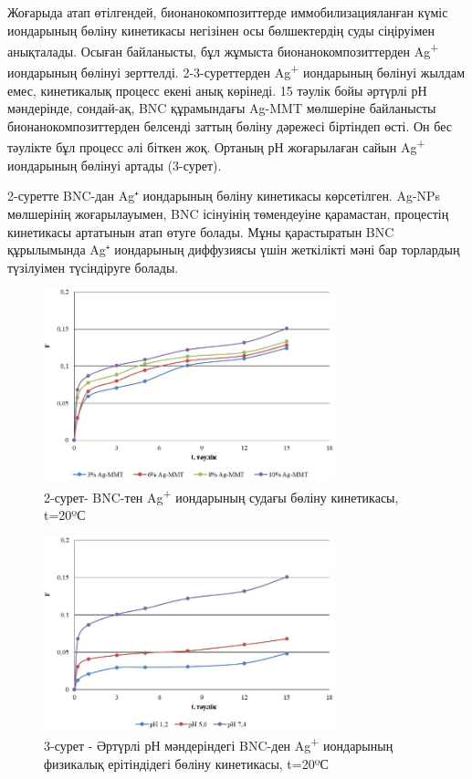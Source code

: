 \begin{multicols}{2}
Жоғарыда атап өтілгендей, бионанокомпозиттерде иммобилизацияланған күміс
иондарының бөліну кинетикасы негізінен осы бөлшектердің суды сіңіруімен
анықталады. Осыған байланысты, бұл жұмыста бионанокомпозиттерден
Ag\textsuperscript{+} иондарының бөлінуі зерттелді. 2-3-суреттерден
Ag\textsuperscript{+} иондарының бөлінуі жылдам емес, кинетикалық
процесс екені анық көрінеді. 15 тәулік бойы әртүрлі рН мәндерінде,
сондай-ақ, BNC құрамындағы Ag-MMT мөлшеріне байланысты
бионанокомпозиттерден белсенді заттың бөліну дәрежесі біртіндеп өсті. Он
бес тәулікте бұл процесс әлі біткен жоқ. Ортаның рН жоғарылаған сайын
Ag\textsuperscript{+} иондарының бөлінуі артады (3-сурет).

2-суретте BNC-дан Ag⁺ иондарының бөліну кинетикасы көрсетілген. Ag-NPs
мөлшерінің жоғарылауымен, BNC ісінуінің төмендеуіне қарамастан,
процестің кинетикасы артатынын атап өтуге болады. Мұны қарастыратын BNC
құрылымында Ag⁺ иондарының диффузиясы үшін жеткілікті мәні бар торлардың
түзілуімен түсіндіруге болады.
\end{multicols}

\begin{figure}[H]
	\centering
	\includegraphics[width=0.75\textwidth]{media/chem/image15}
	\caption*{2-сурет- BNC-тен Ag\textsuperscript{+} иондарының судағы бөліну
кинетикасы, t=20ºС}
\end{figure}

\begin{figure}[H]
	\centering
	\includegraphics[width=0.75\textwidth]{media/chem/image16}
	\caption*{3-сурет - Әртүрлі рН мәндеріндегі BNC-ден Ag\textsuperscript{+}
иондарының физикалық ерітіндідегі бөліну кинетикасы, t=20ºС}
\end{figure}

